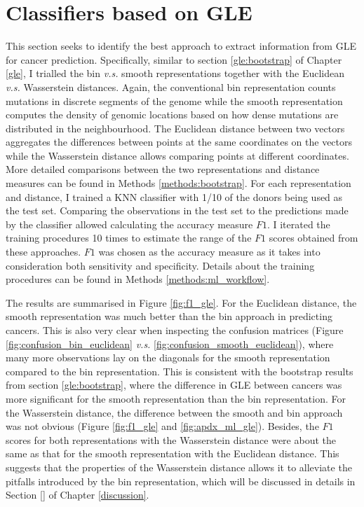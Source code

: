 \section{Classifiers based on GLE}\label{ml:gle}
This section seeks to identify the best approach to extract information from GLE for cancer prediction. Specifically, similar to section \ref{gle:bootstrap} of Chapter \ref{gle}, I trialled the bin \textit{v.s.} smooth representations together with the Euclidean \textit{v.s.} Wasserstein distances. Again, the conventional bin representation counts mutations in discrete segments of the genome while the smooth representation computes the density of genomic locations based on how dense mutations are distributed in the neighbourhood. The Euclidean distance between two vectors aggregates the differences between points at the same coordinates on the vectors while the Wasserstein distance allows comparing points at different coordinates. More detailed comparisons between the two representations and distance measures can be found in Methods \ref{methods:bootstrap}. For each representation and distance, I trained a KNN classifier with 1/10 of the donors being used as the test set. Comparing the observations in the test set to the predictions made by the classifier allowed calculating the accuracy measure $F1$. I iterated the training procedures 10 times to estimate the range of the $F1$ scores obtained from these approaches. $F1$ was chosen as the accuracy measure as it takes into consideration both sensitivity and specificity. Details about the training procedures can be found in Methods \ref{methods:ml_workflow}.

The results are summarised in Figure \ref{fig:f1_gle}. For the Euclidean distance, the smooth representation was much better than the bin approach in predicting cancers. This is also very clear when inspecting the confusion matrices (Figure \ref{fig:confusion_bin_euclidean} \textit{v.s.} \ref{fig:confusion_smooth_euclidean}), where many more observations lay on the diagonals for the smooth representation compared to the bin representation. This is consistent with the bootstrap results from section \ref{gle:bootstrap}, where the difference in GLE between cancers was more significant for the smooth representation than the bin representation. For the Wasserstein distance, the difference between the smooth and bin approach was not obvious (Figure \ref{fig:f1_gle} and \ref{fig:apdx_ml_gle}). Besides, the $F1$ scores for both representations with the Wasserstein distance were about the same as that for the smooth representation with the Euclidean distance. This suggests that the properties of the Wasserstein distance allows it to alleviate the pitfalls introduced by the bin representation, which will be discussed in details in Section \ref{} of Chapter \ref{discussion}. 

